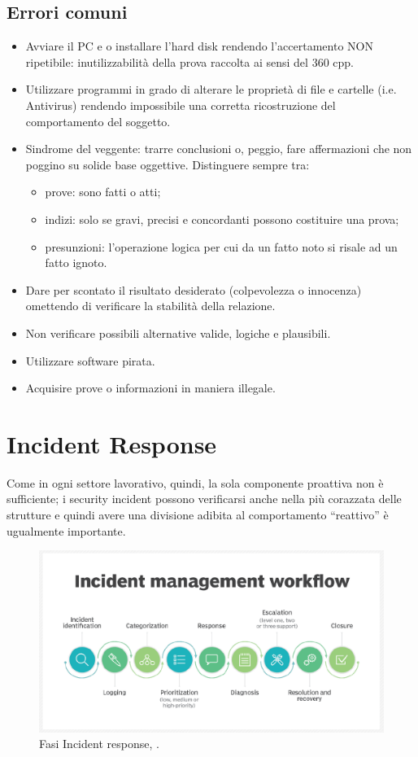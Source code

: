 \section{Errori comuni}
\begin{itemize}
    \item Avviare il PC e o installare l'hard disk rendendo l'accertamento NON ripetibile: inutilizzabilità della prova raccolta ai sensi del 360 cpp.
    \item Utilizzare programmi in grado di alterare le proprietà di file e cartelle (i.e. Antivirus) rendendo impossibile una corretta ricostruzione del comportamento del soggetto.
    \item Sindrome del veggente: trarre conclusioni o, peggio, fare affermazioni che non poggino su solide base oggettive. Distinguere sempre tra:
    \begin{itemize}
        \item prove: sono fatti o atti;
        \item indizi: solo se gravi, precisi e concordanti possono costituire una prova;
        \item presunzioni: l'operazione logica per cui da un fatto noto si risale ad un fatto ignoto.
    \end{itemize}
    \item Dare per scontato il risultato desiderato (colpevolezza o innocenza) omettendo di verificare la stabilità della relazione.
    \item Non verificare possibili alternative valide, logiche e plausibili.
    \item Utilizzare software pirata.
    \item Acquisire prove o informazioni in maniera illegale.
\end{itemize}

\chapter{Incident Response}
Come in ogni settore lavorativo, quindi, la sola componente proattiva non è sufficiente; i security incident possono verificarsi anche nella più corazzata delle strutture e quindi avere una divisione adibita al comportamento “reattivo” è ugualmente importante.

\begin{figure}[H]
	\centering
    \includegraphics[width=15cm, keepaspectratio]{img/incident_response_fasi.png}
	\caption{Fasi Incident response, \cite{incident-response-immagine}.}\label{fig:incident_response}
\end{figure}

